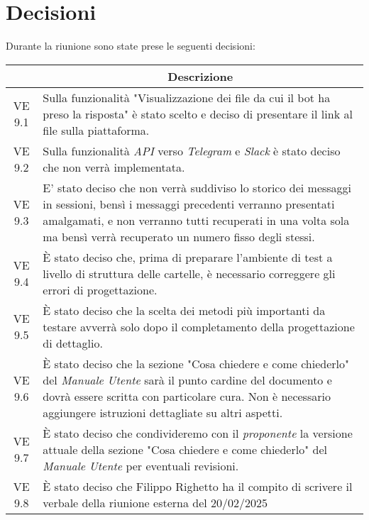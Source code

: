 

\section{Decisioni}

Durante la riunione sono state prese le seguenti decisioni:

\vspace{0.5cm}

\begin{table}[htbp]
    \centering
    \begin{tabular}{|c|p{}|}
        \hline
        \rowcolor[gray]{0.75}
        \multicolumn{1}{|c|}{\textbf{Codice}} & \multicolumn{1}{|c|}{\textbf{Descrizione}}\\
        \hline
        VE 9.1 & Sulla funzionalità "Visualizzazione dei file da cui il bot ha preso la risposta" è stato scelto e deciso di
        presentare il link al file sulla piattaforma.\\
        \hline
        VE 9.2 & Sulla funzionalità \emph{API} verso \emph{Telegram} e \emph{Slack} è stato deciso che non verrà implementata.\\
        \hline
        VE 9.3 & E' stato deciso che non verrà suddiviso lo storico dei messaggi in sessioni, bensì i messaggi precedenti verranno
        presentati amalgamati, e non verranno tutti recuperati in una volta sola ma bensì verrà recuperato un numero fisso degli
        stessi.\\
        \hline
        VE 9.4 & È stato deciso che, prima di preparare l'ambiente di test a livello di struttura delle cartelle, è necessario
        correggere gli errori di progettazione.\\
        \hline
        VE 9.5 & È stato deciso che la scelta dei metodi più importanti da testare avverrà solo dopo il completamento della
        progettazione di dettaglio.\\
        \hline
        VE 9.6 & È stato deciso che la sezione "Cosa chiedere e come chiederlo" del \emph{Manuale Utente} sarà il punto cardine del
        documento e dovrà essere scritta con particolare cura. Non è necessario aggiungere istruzioni dettagliate su altri aspetti.\\
        \hline
        VE 9.7 & È stato deciso che condivideremo con il \emph{proponente} la versione attuale della sezione "Cosa chiedere e come
        chiederlo" del \emph{Manuale Utente} per eventuali revisioni.\\
        \hline
        VE 9.8 & È stato deciso che Filippo Righetto ha il compito di scrivere il verbale della riunione esterna del 20/02/2025\\
        \hline
    \end{tabular}
\end{table}